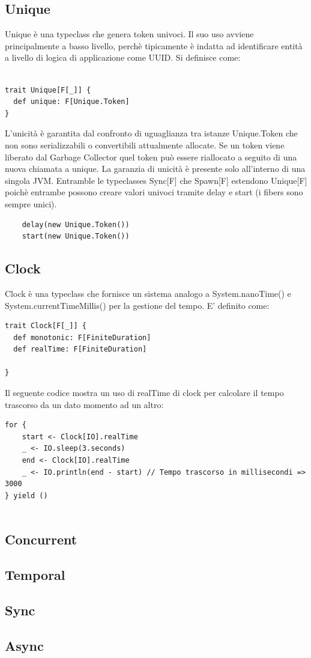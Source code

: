\subsection{Unique}
Unique è una typeclass che genera token univoci. Il suo uso avviene principalmente a basso livello, perchè tipicamente è indatta ad identificare entità a livello di logica di applicazione come UUID. Si definisce come: 
\begin{verbatim}

trait Unique[F[_]] {
  def unique: F[Unique.Token]
}
\end{verbatim}

L'unicità è garantita dal confronto di uguaglianza tra istanze Unique.Token che non sono serializzabili o convertibili attualmente allocate. Se un token viene liberato dal Garbage Collector quel token può essere
riallocato a seguito di una nuova chiamata a unique. La garanzia di unicità è  presente solo all’interno di una singola JVM. Entramble le typeclasses Sync[F] che Spawn[F] estendono Unique[F] poichè entrambe possono creare valori univoci tramite delay e start (i fibers sono sempre unici). 
\begin{verbatim}
    delay(new Unique.Token())
    start(new Unique.Token())
\end{verbatim}

\subsection{Clock}
Clock è una typeclass che fornisce un sistema analogo a System.nanoTime() e System.currentTimeMillis() per la gestione del tempo. E' definito come:
\begin{verbatim}
trait Clock[F[_]] {
  def monotonic: F[FiniteDuration]
  def realTime: F[FiniteDuration]

}
\end{verbatim}

Il seguente codice mostra un uso di realTime di clock per calcolare il tempo trascorso da un dato momento ad un altro:

\begin{verbatim}
for {
    start <- Clock[IO].realTime
    _ <- IO.sleep(3.seconds)
    end <- Clock[IO].realTime
    _ <- IO.println(end - start) // Tempo trascorso in millisecondi => 3000
} yield ()
    
\end{verbatim}

\subsection{Concurrent}
\subsection{Temporal}
\subsection{Sync}
\subsection{Async}